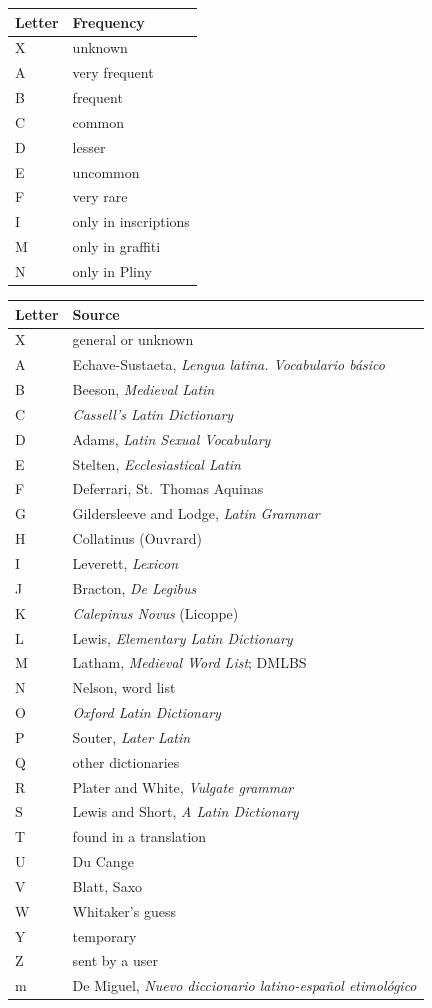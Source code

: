 \documentclass[12pt,
              article,
              oneside
              ]{memoir}
\begin{document}
\begin{longtable}{@{}lp{}@{}}
\toprule
Letter & Frequency\\
\midrule
\endhead
X & unknown\\
A & very frequent\\
B & frequent\\
C & common\\
D & lesser\\
E & uncommon\\
F & very rare\\
I & only in inscriptions\\
M & only in graffiti\\
N & only in Pliny\\
\bottomrule
\end{longtable}

\begin{longtable}{@{}lp{}@{}}
\toprule
Letter & Source\\
\midrule
\endhead
X & general or unknown\\
A & Echave-Sustaeta, \textit{Lengua latina. Vocabulario básico}\\
B & Beeson, \textit{Medieval Latin}\\
C & \textit{Cassell's Latin Dictionary}\\
D & Adams, \textit{Latin Sexual Vocabulary}\\
E & Stelten, \textit{Ecclesiastical Latin}\\
F & Deferrari, St.~Thomas Aquinas\\
G & Gildersleeve and Lodge, \textit{Latin Grammar}\\
H & Collatinus (Ouvrard)\\
I & Leverett, \textit{Lexicon}\\
J & Bracton, \textit{De Legibus}\\
K & \textit{Calepinus Novus} (Licoppe)\\
L & Lewis, \textit{Elementary Latin Dictionary}\\
M & Latham, \textit{Medieval Word List}; DMLBS\\
N & Nelson, word list\\
O & \textit{Oxford Latin Dictionary}\\
P & Souter, \textit{Later Latin}\\
Q & other dictionaries\\
R & Plater and White, \textit{Vulgate grammar}\\
S & Lewis and Short, \textit{A Latin Dictionary}\\
T & found in a translation\\
U & Du Cange\\
V & Blatt, Saxo\\
W & Whitaker's guess\\
Y & temporary\\
Z & sent by a user\\
m & De Miguel, \textit{Nuevo diccionario latino-español etimológico}\\
\bottomrule
\end{longtable}
\end{document}
